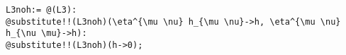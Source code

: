 \documentclass[11pt]{article}
\begin{document}
{\color[named]{Blue}\begin{verbatim}
L3noh:= @(L3):
@substitute!!(L3noh)(\eta^{\mu \nu} h_{\mu \nu}->h, \eta^{\mu \nu} h_{\nu \mu}->h):
@substitute!!(L3noh)(h->0);
\end{verbatim}}
\end{document}
